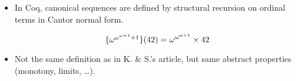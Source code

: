 \documentclass[10pt, fleqn]{beamer}
\begin{document}
\begin{frame}
   
     \begin{block}{}
       \begin{itemize}
       \item In Coq, canonical sequences are defined by structural recursion on ordinal terms in Cantor normal form.
         
   {\color{mathcolor}
         $$\mbox{$\{\omega^{\omega^{\omega+1}+1}\}(42)$}=
         \omega^{\omega^{\omega+1}}\times 42$$
         }
         
         
       \item Not the same definition as in K. \& S.'s article, but same abstract properties (monotony, limits, \dots).
       \end{itemize}
     \end{block}
\end{frame}
\end{document}
